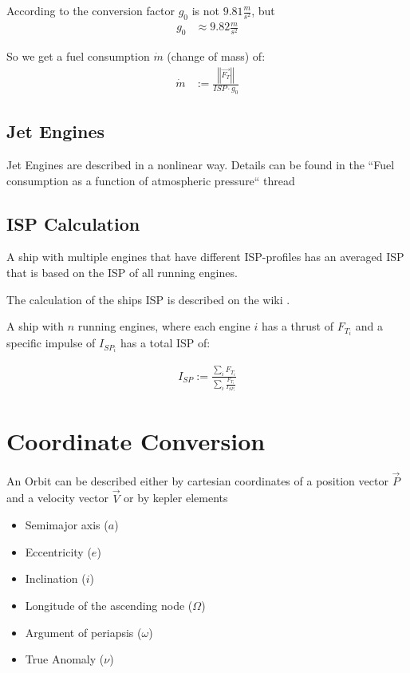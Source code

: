 \documentclass[11pt]{article}
\newcommand{\oa}[1]{\overrightarrow{#1}}
\newcommand{\Pos}{\oa{P}}
\newcommand{\Vel}{\oa{V}}
\newcommand{\absvec}[1]{\left|\left|{#1}\right|\right|}
\begin{document}
According to \cite{ECF} the conversion factor $g_0$ is not
$9.81\frac{m}{s^2}$, but
\begin{align}
  g_0 &\approx 9.82\frac{m}{s^2}
\end{align}

So we get a fuel consumption $\dot{m}$ (change of mass) \cite{SPI} of:
\begin{align}
\dot{m} & := \frac{\absvec{\oa{F_T}}}{ISP \cdot g_0}
\end{align}

\subsection{Jet Engines}

Jet Engines are described in a nonlinear way. Details can be found in
the ``Fuel consumption as a function of atmospheric pressure`` thread
\cite{JetEngines}

\subsection{ISP Calculation}

A ship with multiple engines that have different ISP-profiles has an
averaged ISP that is based on the ISP of all running engines.

The calculation of the ships ISP is described on the wiki
\cite{MulEng}.

A ship with $n$ running engines, where each engine $i$ has a thrust of
$F_{T_i}$ and a specific impulse of $I_{SP_i}$ has a total ISP of:

\begin{align}
  I_{SP} := \frac{\sum_i{F_{T_i}}}{\sum_i{\frac{F_{T_i}}{I_{SP_i}}}}
\end{align}


\section{Coordinate Conversion}

An Orbit can be described either by cartesian coordinates of a
position vector $\Pos$ and a velocity vector $\Vel$ or by kepler
elements \cite{Kepler}

\begin{itemize}
\item Semimajor axis ($a$)
\item Eccentricity ($e$)
\item Inclination ($i$)
\item Longitude of the ascending node ($\Omega$)
\item Argument of periapsis ($\omega$)
\item True Anomaly ($\nu$)
\end{itemize}
\end{document}
